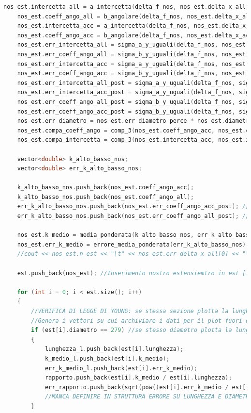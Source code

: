 \documentclass[a4paper,11pt,oneside]{article}
\begin{document}
\begin{lstlisting}[language=C++, label=lst:seconda_parte, caption=seconda\_parte]
	nos_est.intercetta_all = a_intercetta(delta_f_nos, nos_est.delta_x_all);				//non metto err perchè tutti uguali
	nos_est.coeff_ango_all = b_angolare(delta_f_nos, nos_est.delta_x_all);					//
	nos_est.intercetta_acc = a_intercetta(delta_f_nos, nos_est.delta_x_acc);				//non metto err perchè tutti uguali
	nos_est.coeff_ango_acc = b_angolare(delta_f_nos, nos_est.delta_x_acc);					//
	nos_est.err_intercetta_all = sigma_a_y_uguali(delta_f_nos, nos_est.err_delta_x_all[0]); //attenzione al double
	nos_est.err_coeff_ango_all = sigma_b_y_uguali(delta_f_nos, nos_est.err_delta_x_all[0]); //
	nos_est.err_intercetta_acc = sigma_a_y_uguali(delta_f_nos, nos_est.err_delta_x_acc[0]); //attenzione al double
	nos_est.err_coeff_ango_acc = sigma_b_y_uguali(delta_f_nos, nos_est.err_delta_x_acc[0]); //
	nos_est.err_intercetta_all_post = sigma_a_y_uguali(delta_f_nos, sigma_post_all);		//Sigma di a e b in all e acc con la sigma post
	nos_est.err_intercetta_acc_post = sigma_a_y_uguali(delta_f_nos, sigma_post_acc);
	nos_est.err_coeff_ango_all_post = sigma_b_y_uguali(delta_f_nos, sigma_post_all);
	nos_est.err_coeff_ango_acc_post = sigma_b_y_uguali(delta_f_nos, sigma_post_acc);
	nos_est.err_diametro = nos_est.err_diametro_perce * nos_est.diametro;
	nos_est.compa_coeff_ango = comp_3(nos_est.coeff_ango_acc, nos_est.coeff_ango_all, nos_est.err_coeff_ango_acc_post, nos_est.err_coeff_ango_all_post); //
	nos_est.compa_intercetta = comp_3(nos_est.intercetta_acc, nos_est.intercetta_all, nos_est.err_intercetta_acc_post, nos_est.err_intercetta_all_post);

	vector<double> k_alto_basso_nos;
	vector<double> err_k_alto_basso_nos;

	k_alto_basso_nos.push_back(nos_est.coeff_ango_acc);
	k_alto_basso_nos.push_back(nos_est.coeff_ango_all);
	err_k_alto_basso_nos.push_back(nos_est.err_coeff_ango_acc_post); //se non vuoi post elimina _post e utilizzerà errori piccoli
	err_k_alto_basso_nos.push_back(nos_est.err_coeff_ango_all_post); //

	nos_est.k_medio = media_ponderata(k_alto_basso_nos, err_k_alto_basso_nos);
	nos_est.err_k_medio = errore_media_ponderata(err_k_alto_basso_nos);
	//cout << nos_est.n_est << "\t" << nos_est.err_delta_x_all[0] << "\t" << nos_est.err_delta_x_acc[0] << endl;

	est.push_back(nos_est); //Inserimento nostro estensiemtro in est [il kracken arriva =) ]

	for (int i = 0; i < est.size(); i++)
	{
		//VERIFICA DI LEGGE DI YOUNG: se stessa sezione plotta la lunghezza e il relativo k (solo acciaio)
		//Genera i vettori su cui archiviare i dati per il plot fuori dal ciclo
		if (est[i].diametro == 279) //se stesso diametro plotta la lunghezza
		{
			lunghezza_l.push_back(est[i].lunghezza);
			k_medio_l.push_back(est[i].k_medio);
			err_k_medio_l.push_back(est[i].err_k_medio);
			rapporto.push_back(est[i].k_medio / est[i].lunghezza);
			err_rapporto.push_back(sqrt(pow((est[i].err_k_medio / est[i].lunghezza), 2) + pow(((est[i].k_medio * est[i].err_lunghezza) / pow(est[i].lunghezza, 2)), 2)));
			//MANCA DEFINIRE IN STRUTTURA ERRORE SU LUNGHEZZA E DIAMETRO
		}


\end{lstlisting}
\end{document}

